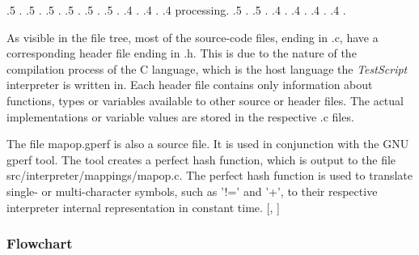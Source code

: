 \documentclass[12pt,a4paper]{article}
\newcommand{\name}{\emph{TestScript}}
\begin{document}
\begin{minipage}{\textwidth}
{\begin{flushleft}
{                    .5 .
                    .5 .
                    .5 .
                    .5 .
                    .5 .
                    .5 .
                .4 .
                .4 .
                .4 processing.
                    .5 .
                    .5 .
                .4 .
                .4 .
                .4 .
                .4 .
    }
\end{flushleft}}

\end{minipage}
\linebreak

As visible in the file tree, most of the source-code files, ending in .c,
have a corresponding header file ending in .h. This is due to the nature
of the compilation process of the C language, which is the host language
the \name{} interpreter is written in.
Each header file contains only information about functions, types or variables
available to other source or header files. The actual implementations or 
variable values are stored in the respective .c files.

The file mapop.gperf is also a source file. It is used in conjunction with the GNU gperf
tool. The tool creates a perfect hash function, which is output to the file
src/interpreter/mappings/mapop.c. The perfect hash function is used to translate
single- or multi-character symbols, such as '!=' and '+', to their respective
interpreter internal representation in constant time.
[, ]

\subsubsection{Flowchart}
\end{document}
